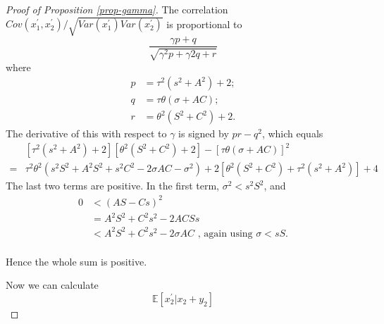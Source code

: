 \documentclass[
  12pt,
]{article}
\theoremstyle{definition}
\theoremstyle{definition}
\theoremstyle{definition}
\theoremstyle{definition}
\theoremstyle{remark}
\begin{document}
\begin{proof}[Proof of Proposition \ref{prop-gamma}]
The correlation $Cov(x_{1}^{\prime},x_{2}^{\prime})/\sqrt{Var(x_{1}^{\prime})Var(x_{2}^{\prime})}$
is proportional to
\[
\frac{\gamma p+q}{\sqrt{\gamma^{2}p+\gamma2q+r}}
\]
where 
\begin{align*}
p & =\tau^{2}(s^{2}+A^{2})+2;\\
q & =\tau\theta(\sigma+AC);\\
r & =\theta^{2}(S^{2}+C^{2})+2.
\end{align*}
The derivative of this with respect to $\gamma$ is signed by $pr-q^{2}$, 
which equals
\begin{align*}
 & [\tau^{2}(s^{2}+A^{2})+2][\theta^{2}(S^{2}+C^{2})+2]-[\tau\theta(\sigma+AC)]^{2}\\
= & \tau^{2}\theta^{2}(s^{2}S^{2}+A^{2}S^{2}+s^{2}C^{2}-2\sigma AC-\sigma^{2})+2[\theta^{2}(S^{2}+C^{2})+\tau^{2}(s^{2}+A^{2})]+4
\end{align*}
The last two terms are positive. In the first term, $\sigma^{2}<s^{2}S^{2}$,
and
\begin{align*}
0 & <(AS-Cs)^{2}\\
 & =A^{2}S^{2}+C^{2}s^{2}-2ACSs\\
 & <A^{2}S^{2}+C^{2}s^{2}-2\sigma AC\textrm{ , again using }\sigma<sS.\\
\end{align*}

Hence the whole sum is positive.


Now we can calculate
\[
\mathbb{E}[x_{2}^{\prime}|x_{2}+y_{2}]
\]


\end{proof}
\end{document}
